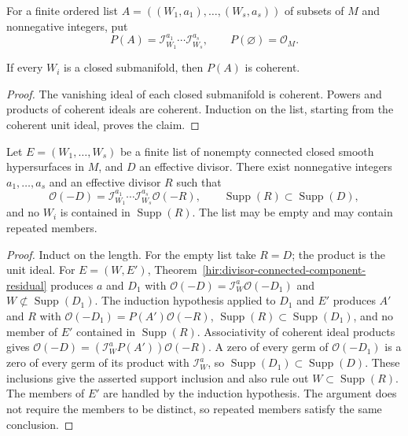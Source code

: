 \begin{definition}
\label{hir:divisor-finite-component-product}
\leanok
For a finite ordered list $A=((W_1,a_1),\ldots,(W_s,a_s))$ of subsets
of $M$ and nonnegative integers, put
\[
 P(A)=\mathcal I_{W_1}^{a_1}\cdots\mathcal I_{W_s}^{a_s},\qquad
 P(\varnothing)=\mathcal O_M.
\]
\end{definition}

\begin{lemma}
\label{hir:divisor-finite-component-product-coherent}
\leanok
If every $W_i$ is a closed submanifold, then $P(A)$ is coherent.
\end{lemma}
\begin{proof}
The vanishing ideal of each closed submanifold is coherent. Powers
and products of coherent ideals are coherent. Induction on the list,
starting from the coherent unit ideal, proves the claim.
\end{proof}

\begin{theorem}
\label{hir:divisor-finite-connected-component-residual}
\leanok
Let $E=(W_1,\ldots,W_s)$ be a finite list of nonempty connected closed
smooth hypersurfaces in $M$, and $D$ an effective divisor. There exist
nonnegative integers $a_1,\ldots,a_s$ and an effective divisor $R$ such that
\[
 \mathcal O(-D)=\mathcal I_{W_1}^{a_1}\cdots
 \mathcal I_{W_s}^{a_s}\mathcal O(-R),
 \qquad \operatorname{Supp}(R)\subset\operatorname{Supp}(D),
\]
and no $W_i$ is contained in $\operatorname{Supp}(R)$.
The list may be empty and may contain repeated members.
\end{theorem}
\begin{proof}
Induct on the length. For the empty list take $R=D$; the product is
the unit ideal. For $E=(W,E')$, Theorem~\ref{hir:divisor-connected-component-residual}
produces $a$ and $D_1$ with
$\mathcal O(-D)=\mathcal I_W^a\mathcal O(-D_1)$ and
$W\not\subset\operatorname{Supp}(D_1)$. The induction hypothesis
applied to $D_1$ and $E'$ produces $A'$ and $R$ with
$\mathcal O(-D_1)=P(A')\mathcal O(-R)$,
$\operatorname{Supp}(R)\subset\operatorname{Supp}(D_1)$, and no
member of $E'$ contained in $\operatorname{Supp}(R)$.
Associativity of coherent ideal products gives
$\mathcal O(-D)=(\mathcal I_W^aP(A'))\mathcal O(-R)$.
A zero of every germ of $\mathcal O(-D_1)$ is a zero of every germ
of its product with $\mathcal I_W^a$, so
$\operatorname{Supp}(D_1)\subset\operatorname{Supp}(D)$.
These inclusions give the asserted support inclusion and also rule
out $W\subset\operatorname{Supp}(R)$.
The members of $E'$ are handled by the induction hypothesis. The
argument does not require the members to be distinct, so repeated
members satisfy the same conclusion.
\end{proof}

